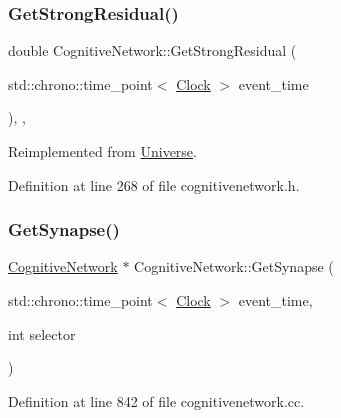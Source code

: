 \subsubsection{\texorpdfstring{Get\+Strong\+Residual()}{GetStrongResidual()}}
{\footnotesize\ttfamily double Cognitive\+Network\+::\+Get\+Strong\+Residual (\begin{DoxyParamCaption}\item[{std\+::chrono\+::time\+\_\+point$<$ \mbox{\hyperlink{universe_8h_a0ef8d951d1ca5ab3cfaf7ab4c7a6fd80}{Clock}} $>$}]{event\+\_\+time }\end{DoxyParamCaption})\hspace{0.3cm}{\ttfamily [inline]}, {\ttfamily [final]}, {\ttfamily [virtual]}}



Reimplemented from \mbox{\hyperlink{class_universe_af0f4b81950061e63c2855eb40957a5b1}{Universe}}.



Definition at line 268 of file cognitivenetwork.\+h.

\mbox{\label{class_cognitive_network_a1944aaa13667bc267e6ef44892da969d}} 
\subsubsection{\texorpdfstring{Get\+Synapse()}{GetSynapse()}}
{\footnotesize\ttfamily \mbox{\hyperlink{class_cognitive_network}{Cognitive\+Network}} $\ast$ Cognitive\+Network\+::\+Get\+Synapse (\begin{DoxyParamCaption}\item[{std\+::chrono\+::time\+\_\+point$<$ \mbox{\hyperlink{universe_8h_a0ef8d951d1ca5ab3cfaf7ab4c7a6fd80}{Clock}} $>$}]{event\+\_\+time,  }\item[{int}]{selector }\end{DoxyParamCaption})}



Definition at line 842 of file cognitivenetwork.\+cc.

\mbox{\label{class_cognitive_network_ae0068b9df823e1b10fed3c73f1cb4702}} 
